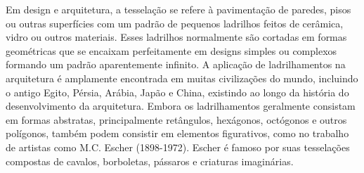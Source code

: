 Em design e arquitetura, a tesselação se refere à pavimentação de paredes, pisos ou outras superfícies com um padrão de pequenos ladrilhos feitos de cerâmica, vidro ou outros materiais. Esses ladrilhos normalmente são cortadas em formas geométricas que se encaixam perfeitamente em designs simples ou complexos formando um padrão aparentemente infinito. A aplicação de ladrilhamentos  na arquitetura  é  amplamente encontrada em muitas civilizações do mundo, incluindo o antigo Egito, Pérsia, Arábia, Japão e China, existindo ao longo da história do desenvolvimento da arquitetura. Embora os ladrilhamentos geralmente consistam em formas abstratas, principalmente retângulos, hexágonos, octógonos e outros polígonos, também podem consistir em elementos figurativos, como no trabalho de artistas como M.C. Escher (1898-1972). Escher é famoso por suas tesselações compostas de cavalos, borboletas, pássaros e criaturas imaginárias.


